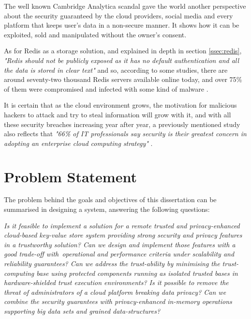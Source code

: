 The well known Cambridge Analytica scandal \cite{cambridge_analytica:1} gave the world another perspective about the security guaranteed by the cloud providers, social media and every platform that keeps user's data in a non-secure manner. It shows how it can be exploited, sold and manipulated without the owner's consent.

As for Redis as a storage solution, and explained in depth in section \ref{ssec:redis}, \textit{"Redis should not be publicly exposed as it has no default authentication and all the data is stored in clear text"} and so, according to some studies, there are around seventy-two thousand Redis servers available online today, and over 75{\%} of them were compromised and infected with some kind of malware \cite{redis_leak:1, redis_leak:2, redis_leak:3}.

It is certain that as the cloud environment grows, the motivation for malicious hackers to attack and try to steal information will grow with it, and with all these security breaches increasing year after year, a previously mentioned study also reflects that \textit{"66{\%} of IT professionals say security is their greatest concern in adopting an enterprise cloud computing strategy"} \cite{cloud_statistic:1}.


\section{Problem Statement} %
\label{sec:problem_statement}

The problem behind the goals and objectives of this dissertation can be summarised in designing a system, answering the following questions:

\textit{Is it feasible to implement a solution for a remote trusted and privacy-enhanced cloud-based key-value store system providing strong security and privacy features in a trustworthy solution? Can we design and implement those features with a good trade-off with operational and performance criteria under scalability and reliability guarantees? Can we address the trust-ability by minimising the trust-computing base using protected components running as isolated trusted bases in hardware-shielded trust execution environments? Is it possible to remove the threat of administrators of a cloud platform breaking data privacy? Can we combine the security guarantees with privacy-enhanced in-memory operations supporting big data sets and grained data-structures?}

